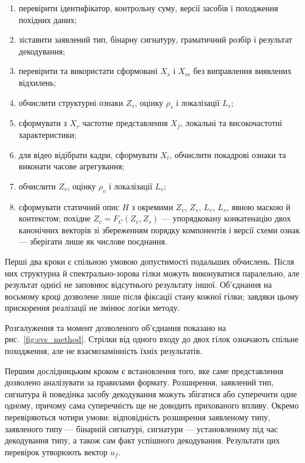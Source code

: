 \begin{enumerate}
\item перевірити ідентифікатор, контрольну суму, версії засобів і походження похідних даних;
\item зіставити заявлений тип, бінарну сигнатуру, граматичний розбір і результат декодування;
\item перевірити та використати сформовані $X_s$ і $X_m$ без виправлення виявлених відхилень;
\item обчислити структурні ознаки $Z_s$, оцінку $\rho_s$ і локалізації $L_s$;
\item сформувати з $X_v$ частотне представлення $X_f$, локальні та високочастотні характеристики;
\item для відео відібрати кадри, сформувати $X_t$, обчислити покадрові ознаки та виконати часове агрегування;
\item обчислити $Z_v$, оцінку $\rho_v$ і локалізації $L_v$;
\item сформувати статичний опис $H$ з окремими $Z_v$, $Z_s$, $L_v$, $L_s$, явною маскою й контекстом; похідне $Z_c=F_C(Z_v,Z_s)$ --- упорядковану конкатенацію двох канонічних векторів зі збереженням порядку компонентів і версії схеми ознак --- зберігати лише як числове поєднання.
\end{enumerate}

Перші два кроки є спільною умовою допустимості подальших обчислень. Після них структурна й спектрально-зорова гілки можуть виконуватися паралельно, але результат однієї не заповнює відсутнього результату іншої. Об’єднання на восьмому кроці дозволене лише після фіксації стану кожної гілки; завдяки цьому прискорення реалізації не змінює логіки методу.

Розгалуження та момент дозволеного об’єднання показано на рис.~\ref{fig:svs_method}. Стрілки від одного входу до двох гілок означають спільне походження, але не взаємозамінність їхніх результатів.



Першим дослідницьким кроком є встановлення того, яке саме представлення дозволено аналізувати за правилами формату. Розширення, заявлений тип, сигнатура й поведінка засобу декодування можуть збігатися або суперечити одне одному, причому сама суперечність ще не доводить прихованого впливу. Окремо перевіряються чотири умови: відповідність розширення заявленому типу, заявленого типу --- бінарній сигнатурі, сигнатури --- установленому під час декодування типу, а також сам факт успішного декодування. Результати цих перевірок утворюють вектор $u_f$.

